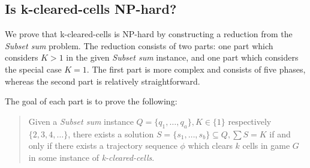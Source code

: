 \subsection{Is k-cleared-cells NP-hard?}

We prove that k-cleared-cells is NP-hard by constructing a reduction from the \textit{Subset sum} problem. The reduction consists of two parts: one part which considers $K > 1$ in the given \textit{Subset sum} instance, and one part which considers the special case $K = 1$. The first part is more complex and consists of five phases, whereas the second part is relatively straightforward.

The goal of each part is to prove the following: 

\begin{quote}
Given a \textit{Subset sum} instance $Q = \{q_1, \ldots, q_a\}, K \in \{1\}$ respectively $\{2, 3, 4, \ldots \}$, there exists a solution $S = \{s_1, \ldots, s_b \} \subseteq Q, \sum S = K$ if and only if there exists a trajectory sequence $\phi$ which clears $k$ cells in game $G$ in some instance of \textit{k-cleared-cells}.
\end{quote}






